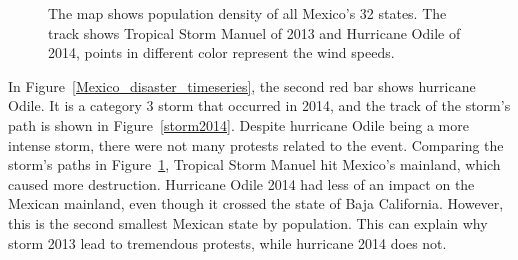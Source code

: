 \documentclass[9pt,twocolumn,twoside]{pnas-new}
\begin{document}
\begin{figure}[ht]
	\centering
	\caption{The map shows population density of all Mexico's 32 states. The track shows Tropical Storm Manuel of 2013 and Hurricane Odile of 2014, points in different color represent the wind speeds. }
\label{Mexico-track-map}
\end{figure}



%

In Figure~\ref{Mexico_disaster_timeseries}, the second red bar shows hurricane Odile.
It is a category 3 storm that occurred in 2014, and the track of the storm's path is shown in Figure~\ref{storm2014}.
Despite hurricane Odile being a more intense storm, there were not many protests related to the event.
Comparing the storm's paths in Figure~\ref{Mexico-track-map}, Tropical Storm Manuel hit Mexico's mainland, which caused more  destruction.
Hurricane Odile 2014 had less of an impact on the Mexican mainland, even though it crossed the state of Baja California. However, this is the second smallest Mexican state by population.
This can explain why storm 2013 lead to tremendous protests, while hurricane 2014 does not.
\end{document}
